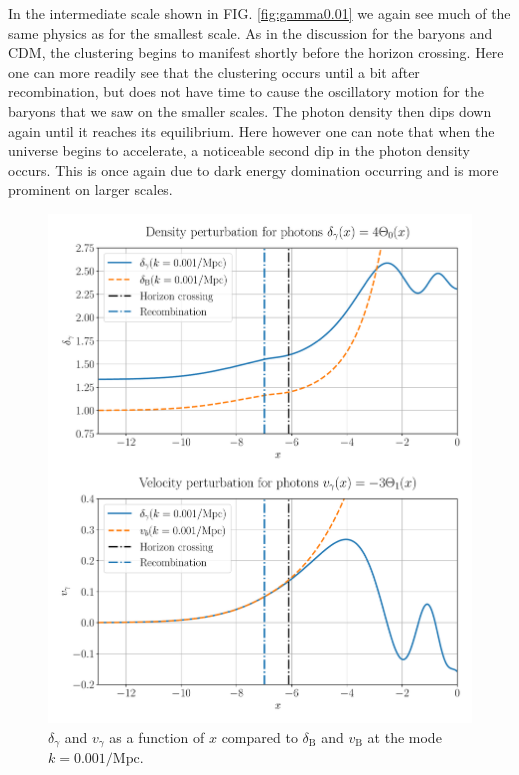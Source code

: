 \documentclass[%
reprint,
 amsmath,amssymb,
 aps,
]{revtex4-2}
\begin{document}
In the intermediate scale shown in FIG. \ref{fig:gamma0.01} we again see much of the same physics as for the smallest scale. As in the discussion for the baryons and CDM, the clustering begins to manifest shortly before the horizon crossing. Here one can more readily see that the clustering occurs until a bit after recombination, but does not have time to cause the oscillatory motion for the baryons that we saw on the smaller scales. The photon density then dips down again until it reaches its equilibrium. Here however one can note that when the universe begins to accelerate, a noticeable second dip in the photon density occurs. This is once again due to dark energy domination occurring and is more prominent on larger scales.

\begin{figure}[ht!]
	\includegraphics[width = \linewidth]{Figures/gamma0.001.pdf}
	\caption{$\delta_\gamma$ and $v_\gamma$ as a function of $x$ compared to $\delta_\text{B}$ and $v_\text{B}$ at the mode $k=0.001/\text{Mpc}$.}
	\label{fig:gamma0.001}
\end{figure}
\end{document}
